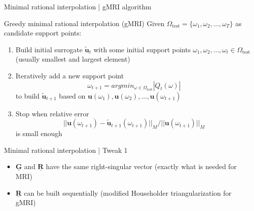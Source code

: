 \documentclass{beamer}
\begin{document}
\begin{frame}{Minimal rational interpolation | gMRI algorithm}
    
    \begin{block}{Greedy minimal rational interpolation (gMRI)}
        Given $\Omega_{\text{test}} = \{\omega_1, \omega_2, \dots, \omega_T\}$ as candidate support points:
        \begin{enumerate}
            \item<1-> Build initial surrogate $\mathbf{\tilde{u}}_{t}$ with some initial support points $\omega_1, \omega_2, \dots, \omega_t \in \Omega_{\text{test}}$ (usually smallest and largest element)
            \item<2-> Iteratively add a new support point
            \begin{equation*}
                \omega_{t+1} = argmin_{\omega \in \Omega_{\text{test}}} |Q_t(\omega)|
            \end{equation*}
            to build $\mathbf{\tilde{u}}_{t+1}$ based on $\mathbf{u}(\omega_1),
            \mathbf{u}(\omega_2), \dots, \mathbf{u}(\omega_{t+1})$
            \item<3-> Stop when relative error 
            \begin{equation*}
                ||\mathbf{u}(\omega_{t+1}) - \mathbf{\tilde{u}}_{t+1}(\omega_{t+1})||_M / ||\mathbf{u}(\omega_{t+1})||_M
            \end{equation*}
            is small enough
        \end{enumerate}
    \end{block}

\end{frame}

\begin{frame}{Minimal rational interpolation | Tweak 1}
    
    \begin{itemize}
        \item<2-> $\mathbf{\underline{G}}$ and $\mathbf{\underline{R}}$ have
        the same right-singular vector (exactly what is needed for MRI)
        \item<3-> $\mathbf{\underline{R}}$ can be built sequentially (modified
        Householder triangularization for gMRI)
    \end{itemize}
    
\end{frame}
\end{document}
